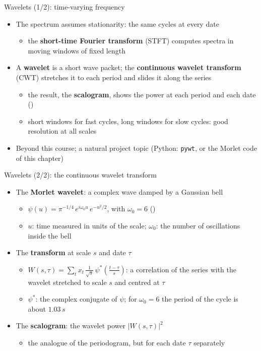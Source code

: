 \begin{frame}{Wavelets (1/2): time-varying frequency}
\itemsize{\small}
\begin{itemize}
    \item The spectrum assumes stationarity: the same cycles at every date
    \begin{itemize}
        \item the \textbf{short-time Fourier transform} (STFT) computes spectra in moving windows of fixed length
    \end{itemize}
    \item A \textbf{wavelet} is a short wave packet; the \textbf{continuous wavelet transform} (CWT) stretches it to each period and slides it along the series
    \begin{itemize}
        \item the result, the \textbf{scalogram}, shows the power at each period and each date ()
        \item short windows for fast cycles, long windows for slow cycles: good resolution at all scales
    \end{itemize}
    \item Beyond this course; a natural project topic (Python: \texttt{pywt}, or the Morlet code of this chapter)
\end{itemize}
\end{frame}

\begin{frame}{Wavelets (2/2): the continuous wavelet transform}
\itemsize{\footnotesize}
\begin{itemize}
    \item The \textbf{Morlet wavelet}: a complex wave damped by a Gaussian bell
    \begin{itemize}
        \item $\psi(u) = \pi^{-1/4}\, e^{i\omega_0 u}\, e^{-u^2/2}$, with $\omega_0 = 6$ ()
        \item $u$: time measured in units of the scale; $\omega_0$: the number of oscillations inside the bell
    \end{itemize}
    \item The \textbf{transform} at scale $s$ and date $\tau$
    \begin{itemize}
        \item $W(s, \tau) = \sum_t x_t\, \frac{1}{\sqrt{s}}\, \psi^*\!\left(\frac{t - \tau}{s}\right)$: a correlation of the series with the wavelet stretched to scale $s$ and centred at $\tau$
        \item $\psi^*$: the complex conjugate of $\psi$; for $\omega_0 = 6$ the period of the cycle is about $1.03\,s$
    \end{itemize}
    \item The \textbf{scalogram}: the wavelet power $|W(s, \tau)|^2$
    \begin{itemize}
        \item the analogue of the periodogram, but for each date $\tau$ separately
    \end{itemize}
\end{itemize}
\end{frame}

